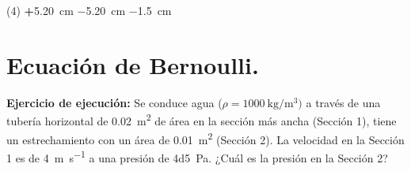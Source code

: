 \documentclass[12pt]{exam}
\begin{document}
\begin{questions}
    \vspace{0.3cm}
    \begin{tasks}(4)
        \task \textbf{+}\SI{5.20}{\centi\meter}
        \task \SI{-5.20}{\centi\meter}
        \task \SI{-1.5}{\centi\meter}
        \task {}
    \end{tasks}








    \setcounter{section}{9}
    \section{Ecuación de Bernoulli.}

    \setcounter{question}{23} \question \textbf{Ejercicio de ejecución:} Se conduce agua ($\rho = \SI{1000}{\kilo\gram\per\cubic\meter})$ a través de una tubería horizontal de \SI{0.02}{\square\meter} de área en la sección más ancha (Sección 1), tiene un estrechamiento con un área de \SI{0.01}{\square\meter} (Sección 2). La velocidad en la Sección 1 es de \SI{4}{\meter\per\second} a una presión de \SI{4d5}{\pascal}. ¿Cuál es la presión en la Sección 2?


\end{questions}
\end{document}
